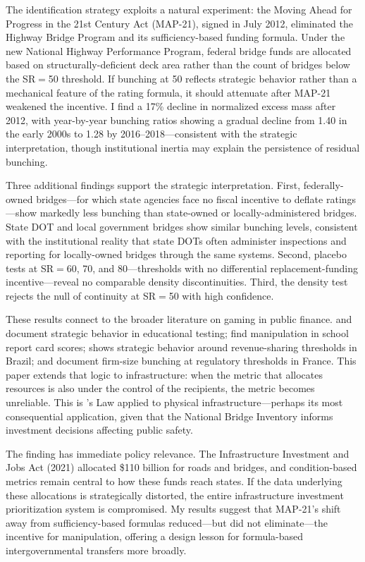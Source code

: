 \documentclass[12pt]{article}
\begin{document}
The identification strategy exploits a natural experiment: the Moving Ahead for Progress in the 21st Century Act (MAP-21), signed in July 2012, eliminated the Highway Bridge Program and its sufficiency-based funding formula. Under the new National Highway Performance Program, federal bridge funds are allocated based on structurally-deficient deck area rather than the count of bridges below the SR$=$50 threshold. If bunching at 50 reflects strategic behavior rather than a mechanical feature of the rating formula, it should attenuate after MAP-21 weakened the incentive. I find a 17\% decline in normalized excess mass after 2012, with year-by-year bunching ratios showing a gradual decline from 1.40 in the early 2000s to 1.28 by 2016--2018---consistent with the strategic interpretation, though institutional inertia may explain the persistence of residual bunching.

Three additional findings support the strategic interpretation. First, federally-owned bridges---for which state agencies face no fiscal incentive to deflate ratings---show markedly less bunching than state-owned or locally-administered bridges. State DOT and local government bridges show similar bunching levels, consistent with the institutional reality that state DOTs often administer inspections and reporting for locally-owned bridges through the same systems. Second, placebo tests at SR$=$60, 70, and 80---thresholds with no differential replacement-funding incentive---reveal no comparable density discontinuities. Third, the \citet{mccrary2008manipulation} density test rejects the null of continuity at SR$=$50 with high confidence.

These results connect to the broader literature on gaming in public finance. \citet{jacob2003rotten} and \citet{figlio2006testing} document strategic behavior in educational testing; \citet{caetano2011test} find manipulation in school report card scores; \citet{litschig2012intergovernmental} shows strategic behavior around revenue-sharing thresholds in Brazil; and \citet{garicano2016government} document firm-size bunching at regulatory thresholds in France. This paper extends that logic to infrastructure: when the metric that allocates resources is also under the control of the recipients, the metric becomes unreliable. This is \citet{goodhart1975problems}'s Law applied to physical infrastructure---perhaps its most consequential application, given that the National Bridge Inventory informs investment decisions affecting public safety.

The finding has immediate policy relevance. The Infrastructure Investment and Jobs Act (2021) allocated \$110 billion for roads and bridges, and condition-based metrics remain central to how these funds reach states. If the data underlying these allocations is strategically distorted, the entire infrastructure investment prioritization system is compromised. My results suggest that MAP-21's shift away from sufficiency-based formulas reduced---but did not eliminate---the incentive for manipulation, offering a design lesson for formula-based intergovernmental transfers more broadly.
\end{document}
